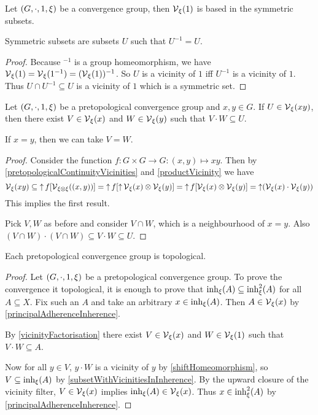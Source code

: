 \begin{lemma} \label{symmetricBase}
Let $\sSet{G,\cdot, 1, \xi}$ be a convergence group, then $\operatorname{\mathcal{V}}_\xi(1)$ is based in the symmetric subsets.
\end{lemma}
Symmetric subsets are subsets $U$ such that $U^{-1} = U$.
\begin{proof}
Because $^{-1}$ is a group homeomorphism, we have $\operatorname{\mathcal{V}}_\xi(1) = \operatorname{\mathcal{V}}_\xi(1^{-1}) = (\operatorname{\mathcal{V}}_\xi(1))^{-1}$. So $U$ is a vicinity of $1$ iff $U^{-1}$ is a vicinity of $1$. Thus $U\cap U^{-1}\subseteq U$ is a vicinity of $1$ which is a symmetric set.
\end{proof}

\begin{lemma} \label{vicinityFactorisation}
Let $\sSet{G,\cdot, 1, \xi}$ be a pretopological convergence group and $x,y\in G$. If $U\in \operatorname{\mathcal{V}}_\xi(xy)$, then there exist $V\in \operatorname{\mathcal{V}}_\xi(x)$ and $W\in \operatorname{\mathcal{V}}_\xi(y)$ such that $V\cdot W\subseteq U$.

If $x=y$, then we can take $V = W$.
\end{lemma}
\begin{proof}
Consider the function $f: G\times G \to G: (x,y)\mapsto xy$. Then by \ref{pretopologicalContinuityVicinities} and \ref{productVicinity} we have
\[ \operatorname{\mathcal{V}}_\xi(xy) \subseteq \operatorname{\uparrow} f[\operatorname{\mathcal{V}}_{\xi\otimes\xi}((x,y))] = \operatorname{\uparrow} f[\operatorname{\uparrow} \operatorname{\mathcal{V}}_\xi(x)\otimes \operatorname{\mathcal{V}}_\xi(y)] = \operatorname{\uparrow} f[\operatorname{\mathcal{V}}_\xi(x)\otimes \operatorname{\mathcal{V}}_\xi(y)] = \operatorname{\uparrow} (\operatorname{\mathcal{V}}_\xi(x)\cdot \operatorname{\mathcal{V}}_\xi(y)) \]
This implies the first result.

Pick $V,W$ as before and consider $V\cap W$, which is a neighbourhood of $x=y$. Also $(V\cap W)\cdot(V\cap W) \subseteq V\cdot W \subseteq U$.
\end{proof}

\begin{proposition} \label{pretopologicalGroupConvergence}
Each pretopological convergence group is topological.
\end{proposition}
\begin{proof}
Let $\sSet{G,\cdot, 1, \xi}$ be a pretopological convergence group. To prove the convergence it topological, it is enough to prove that $\operatorname{inh}_\xi(A) \subseteq \operatorname{inh}^2_\xi(A)$ for all $A\subseteq X$. Fix such an $A$ and take an arbitrary $x\in \operatorname{inh}_\xi(A)$. Then $A\in \operatorname{\mathcal{V}}_\xi(x)$ by \ref{principalAdherenceInherence}.

By \ref{vicinityFactorisation} there exist $V\in \operatorname{\mathcal{V}}_\xi(x)$ and $W\in\operatorname{\mathcal{V}}_\xi(1)$ such that $V\cdot W \subseteq A$.

Now for all $y\in V$, $y\cdot W$ is a vicinity of $y$ by \ref{shiftHomeomorphism}, so $V \subseteq \operatorname{inh}_\xi(A)$ by \ref{subsetWithVicinitiesInInherence}. By the upward closure of the vicinity filter, $V\in \operatorname{\mathcal{V}}_\xi(x)$ implies $\operatorname{inh}_\xi(A) \in \operatorname{\mathcal{V}}_\xi(x)$. Thus $x\in \operatorname{inh}_\xi^2(A)$ by \ref{principalAdherenceInherence}.
\end{proof}

